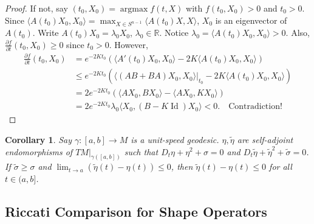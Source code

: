 \documentclass[11pt, a4paper]{article}
\theoremstyle{plain}
\newtheorem{corollary}[theorem]{Corollary}
\theoremstyle{definition}
\theoremstyle{remark}
\DeclareMathOperator{\Id}{Id}
\begin{document}
{\begin{proof}
If not, say $(t_0, X_0) = \operatorname{argmax} f(t,X)$ with $f(t_0, X_0) > 0$ and $t_0 > 0$.
Since $\langle A(t_0)X_0, X_0 \rangle = \max_{X \in S^{n-1}} \langle A(t_0)X, X \rangle$, $X_0$ is an eigenvector of $A(t_0)$. 
Write $A(t_0)X_0 = \lambda_0 X_0$, $\lambda_0 \in \mathbb{R}$. Notice $\lambda_0 = \langle A(t_0)X_0, X_0 \rangle > 0$.
Also, $\frac{\partial f}{\partial t}(t_0, X_0) \ge 0$ since $t_0 > 0$. However,
\begin{align*}
    \frac{\partial f}{\partial t}(t_0, X_0) &= e^{-2Kt_0} \left( \langle A'(t_0)X_0, X_0 \rangle - 2K \langle A(t_0)X_0, X_0 \rangle \right) \\
    &\le e^{-2Kt_0} \left( \langle (AB+BA)X_0, X_0 \rangle|_{t_0} - 2K \langle A(t_0)X_0, X_0 \rangle \right) \\
    &= 2 e^{-2Kt_0} \left( \langle AX_0, BX_0 \rangle - \langle AX_0, KX_0 \rangle \right) \\
    &= 2 e^{-2Kt_0} \lambda_0 \langle X_0, (B - K\Id) X_0 \rangle < 0. \quad \text{Contradiction!}
\end{align*}
\end{proof}

\begin{corollary}
Say $\gamma: [a,b] \to M$ is a unit-speed geodesic. $\eta, \tilde{\eta}$ are self-adjoint endomorphisms of $TM|_{\gamma([a,b])}$ such that $D_t \eta + \eta^2 + \sigma = 0$ and $D_t \tilde{\eta} + \tilde{\eta}^2 + \tilde{\sigma} = 0$. If $\tilde{\sigma} \ge \sigma$ and $\lim_{t \to a}(\tilde{\eta}(t) - \eta(t)) \le 0$, then $\tilde{\eta}(t) - \eta(t) \le 0$ for all $t \in (a,b]$.
\end{corollary}


\subsection{Riccati Comparison for Shape Operators}

}
\end{document}
